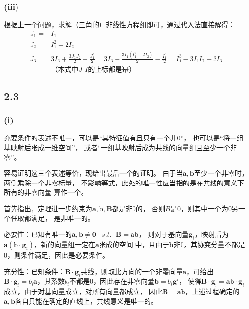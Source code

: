 \documentclass[UTF8,zihao=5]{ctexart}
\newcommand{\bm}[1]{{\mathbf{#1}}}
\begin{document}
\subsubsection*{(iii)}

根据上一个问题，求解（三角的）非线性方程组即可，通过代入法直接解得：
\begin{equation}
    \begin{aligned}
        J_1= & I_1                                    \\
        J_2= & I_1^2-2I_2                             \\
        J_3= & 3I_3+\frac{3J_1J_2}{2}-\frac{J_1^3}{2}
        =3I_3+\frac{3I_1(I_1^2-2I_2)}{2}-\frac{I_1^3}{2}
        =I_1^3-3I_1I_2+3I_3                           \\
             & \text{（本式中$J,I$的上标都是幂）}
    \end{aligned}
\end{equation}

\subsection*{2.3}
\subsubsection*{(i)}
充要条件的表述不唯一，可以是“其特征值有且只有一个非0”，
也可以是“将一组基映射后张成一维空间”，
或者“一组基映射后成为共线的向量组且至少一个非零”。

容易证明这三个表述等价，现给出最后一个的证明。
由于当$\bm{a},\bm{b}$至少一个非零时，两侧乘除一个非零标量，
不影响等式，此处的唯一性应当指的是在共线的意义下所有的非零向量
算作一个。

首先指出，定理进一步约束为$\bm{a},\bm{b},\bm{B}$都是非0的，
否则$B$是0，则其中一个为0另一个任取都满足，
是非唯一的。

必要性：已知有唯一的$\bm{a},\bm{b}\neq\bm{0}\ \ \ \ s.t.\ \ \  \bm{B}=\bm{a}\bm{b}$，
则对于基向量$\bm{g}_i$，映射后为$\bm{a}(\bm{b}\cdot \bm{g}_i)$，新的向量组一定在$\bm{a}$张成的空间
中，且由于$\bm{b}$非0，其协变分量不都是0，则条件满足，因此是必要条件。

充分性：已知条件：$\bm{B}\cdot\bm{g}_i$共线，则取此方向的一个非零向量$\bm{a}$，可给出
$\bm{B}\cdot\bm{g}_i=b_i\bm{a}$，其系数$b_i$不都是0，因此存在非零向量$\bm{b}=b_i\bm{g}^i$，
使得$\bm{B}\cdot\bm{g}_i=\bm{a}\bm{b}\cdot\bm{g}_i$成立，由于对基向量成立，对所有向量都成立，
因此$\bm{B}=\bm{a}\bm{b}$，上述过程确定的$\bm{a}, \bm{b}$各自只能在确定的直线上，共线意义是唯一的。
\end{document}

